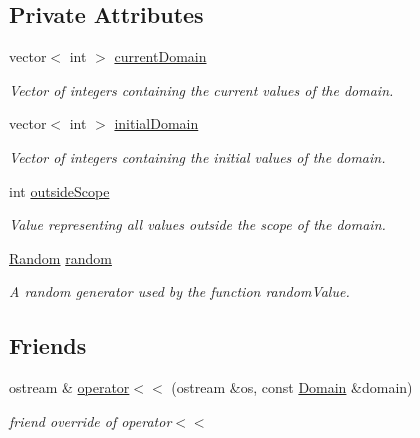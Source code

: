 \subsection*{Private Attributes}
\begin{DoxyCompactItemize}
\item 
vector$<$ int $>$ \hyperlink{classghost_1_1Domain_adda74053affca47211fc8143942bf7a2}{current\-Domain}
\begin{DoxyCompactList}\small\item\em Vector of integers containing the current values of the domain. \end{DoxyCompactList}\item 
vector$<$ int $>$ \hyperlink{classghost_1_1Domain_abbbc0aae802b0a2309c3cabe2c6f3aca}{initial\-Domain}
\begin{DoxyCompactList}\small\item\em Vector of integers containing the initial values of the domain. \end{DoxyCompactList}\item 
int \hyperlink{classghost_1_1Domain_a057618072bec63bce85321dd413eb957}{outside\-Scope}
\begin{DoxyCompactList}\small\item\em Value representing all values outside the scope of the domain. \end{DoxyCompactList}\item 
\hyperlink{classghost_1_1Random}{Random} \hyperlink{classghost_1_1Domain_a124992c8a2807afb606d0d27b34fba1a}{random}
\begin{DoxyCompactList}\small\item\em A random generator used by the function random\-Value. \end{DoxyCompactList}\end{DoxyCompactItemize}
\subsection*{Friends}
\begin{DoxyCompactItemize}
\item 
ostream \& \hyperlink{classghost_1_1Domain_a608c9910828eb2983efb65ff4c297a4e}{operator$<$$<$} (ostream \&os, const \hyperlink{classghost_1_1Domain}{Domain} \&domain)
\begin{DoxyCompactList}\small\item\em friend override of operator$<$$<$ \end{DoxyCompactList}\end{DoxyCompactItemize}


